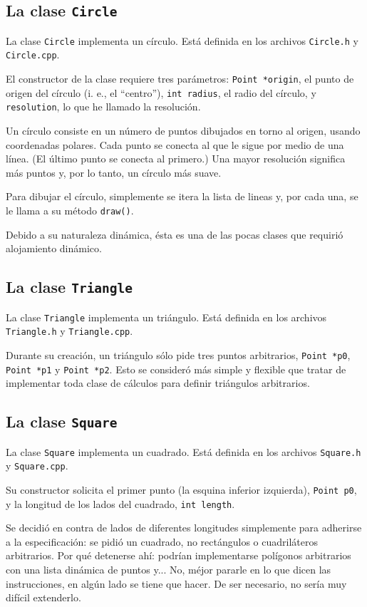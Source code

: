 \subsection{La clase \lstinline!Circle!}

La clase \lstinline!Circle! implementa un círculo. Está definida en los archivos
\lstinline!Circle.h! y \lstinline!Circle.cpp!.

El constructor de la clase requiere tres parámetros: \lstinline!Point *origin!, el
punto de origen del círculo (i. e., el ``centro''), \lstinline!int radius!, el radio
del círculo, y \lstinline!resolution!, lo que he llamado la resolución.

Un círculo consiste en un número de puntos dibujados en torno al origen, usando
coordenadas polares. Cada punto se conecta al que le sigue por medio de una línea.
(El último punto se conecta al primero.) Una mayor resolución significa más puntos y,
por lo tanto, un círculo más suave.

Para dibujar el círculo, simplemente se itera la lista de lineas y, por cada una,
se le llama a su método \lstinline!draw()!.

Debido a su naturaleza dinámica, ésta es una de las pocas clases que requirió alojamiento
dinámico.

\subsection{La clase \lstinline!Triangle!}

La clase \lstinline!Triangle! implementa un triángulo. Está definida en los archivos
\lstinline!Triangle.h! y \lstinline!Triangle.cpp!.

Durante su creación, un triángulo sólo pide tres puntos arbitrarios, \lstinline!Point *p0!,
\lstinline!Point *p1! y \lstinline!Point *p2!. Esto se consideró más simple y flexible
que tratar de implementar toda clase de cálculos para definir triángulos arbitrarios.


\subsection{La clase \lstinline!Square!}

La clase \lstinline!Square! implementa un cuadrado. Está definida en los archivos
\lstinline!Square.h! y \lstinline!Square.cpp!.

Su constructor solicita el primer punto (la esquina inferior izquierda), \lstinline!Point p0!, y la longitud
de los lados del cuadrado, \lstinline!int length!.

Se decidió en contra de lados de diferentes longitudes simplemente para adherirse a la
especificación: se pidió un cuadrado, no rectángulos o cuadriláteros arbitrarios.
Por qué detenerse ahí: podrían implementarse polígonos arbitrarios con una lista dinámica
de puntos y... No, méjor pararle en lo que dicen las instrucciones, en algún lado
se tiene que hacer.
De ser necesario, no sería muy difícil extenderlo.